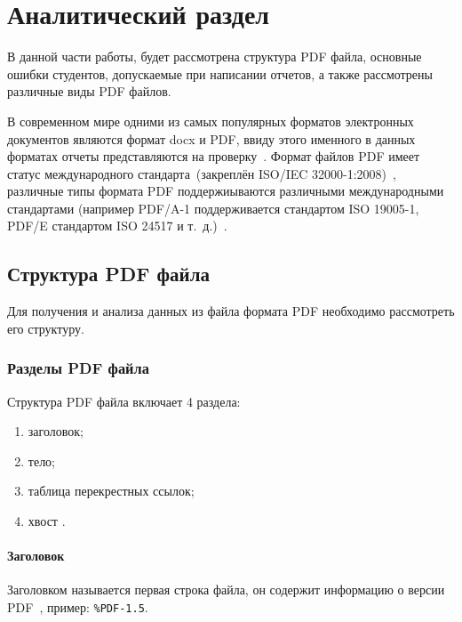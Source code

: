 \chapter{Аналитический раздел}
В данной части работы, будет рассмотрена структура PDF файла, основные ошибки студентов, допускаемые при написании отчетов,
а также рассмотрены различные виды PDF файлов.

В современном мире одними из самых популярных форматов электронных документов являются формат docx и PDF, ввиду этого именного в данных форматах отчеты представляются на проверку~\cite{pdf_pop}.
Формат файлов PDF имеет статус международного  стандарта~(закреплён ISO/IEC 32000-1:2008)~\cite{pdf_iso}, различные типы формата PDF поддержиываются различными международными стандартами (например PDF/A-1 поддерживается стандартом ISO 19005-1, PDF/E стандартом ISO 24517 и т.~д.)~\cite{pdf_iso_e,pdf_iso_a}.

\section{Структура PDF файла}
Для получения и анализа данных из файла формата PDF необходимо рассмотреть его структуру.

\subsection{Разделы PDF файла}
Структура PDF файла включает 4 раздела:
\begin{enumerate}
	\item заголовок;
	\item тело;
	\item таблица перекрестных ссылок;
	\item хвост \cite{pdf_object_def}.
\end{enumerate}

\subsubsection{Заголовок}
Заголовком называется первая строка файла, он содержит информацию о версии PDF~\cite{pdf_object_def}, пример: \texttt{\%PDF-1.5}.


